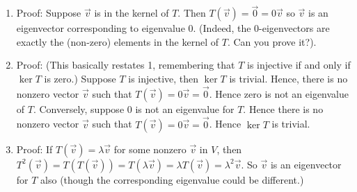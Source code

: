 \begin{SaveQuestion}[
        key=ch7-eigen-tf-sbg,
        prompt={Let $T: V \rightarrow V $ be a linear transformation.  Prove or disprove each statement: \begin{enumerate} \item Any non-zero element in the kernel of   $V \overset{T}\longrightarrow V$  is an eigenvector of $T$. \item The linear transformation $V \overset{T}\longrightarrow V$ is injective if and only if zero is not an eigenvalue of $T$. \item If $\vec v$ is an an eigenvector  of $T$, then $\vec v$ is an eigenvector of $T^2$ as well. \item Every linear transformation has an eigenbasis. \item If $T$ has no real eigenvalues, then also $T^2$ has no real eigenvalues. \item If $\lambda$ is an eigenvalue of some linear transformation $T: V \rightarrow V$, then $\lambda^n$ is a eigenvalue of $T^n: V \rightarrow V$. \end{enumerate}}
][chg-CON-tf,chg-WRIT-matcom] %
    \begin{enumerate}
        \item Proof: Suppose $\vec v$ is in the kernel of $T$. Then $T(\vec v) = \vec 0 = 0 \vec v$ so $\vec v$ is an eigenvector corresponding to eigenvalue $0$. (Indeed, the $0$-eigenvectors are exactly the  (non-zero) elements in the kernel of $T$. Can you prove it?).
        \item Proof: (This basically restates 1, remembering that $T$ is injective if and only if $\ker T$ is zero.) Suppose $T$ is injective, then $\ker T$ is trivial. Hence, there is no nonzero vector $\vec v$ such that $T(\vec v)=0\vec v=\vec 0$. Hence zero is not an eigenvalue of $T$. Conversely, suppose $0$ is not an eigenvalue for $T$. Hence there is no nonzero vector $\vec v$ such that $T(\vec v)=0\vec v=\vec 0$. Hence $\ker T$ is trivial.
        \item Proof: If $T(\vec v) = \lambda \vec v$ for some nonzero $\vec v$ in $V$, then $T^2(\vec v) =  T(T(\vec v))  =  T (\lambda \vec v)  = \lambda  T(\vec v)  = \lambda^2 \vec v$. So $\vec  v$ is an eigenvector for $T$ also (though  the corresponding eigenvalue could be different.)

\end{enumerate}
\end{SaveQuestion}
